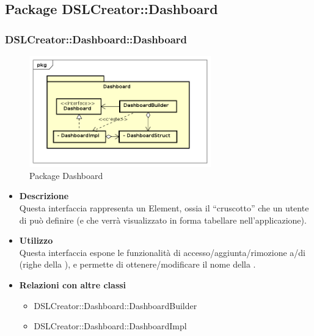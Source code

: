         \subsection{Package DSLCreator::Dashboard}
                \subsubsection{DSLCreator::Dashboard::Dashboard}
                \begin{figure}[H]
                  \centering
                  \includegraphics[width=0.7\textwidth]{res/img/Dashboard.png}
                  \caption{Package Dashboard}
                  \label{fig:diagram_model}
                \end{figure}
                    \begin{itemize}
                        \item \textbf{Descrizione} \hfill \\
                            Questa interfaccia rappresenta un  Element, ossia il ``cruscotto'' che un utente di  può definire (e che verrà visualizzato in forma tabellare nell'applicazione).
                        \item \textbf{Utilizzo}  \hfill \\
                            Questa interfaccia espone le funzionalità di accesso/aggiunta/rimozione a/di  (righe della ), e permette di ottenere/modificare il nome della .
                        \item \textbf{Relazioni con altre classi} \hfill 
                            \begin{itemize}
                              \item DSLCreator::Dashboard::DashboardBuilder
                              \item DSLCreator::Dashboard::DashboardImpl
                            \end{itemize}
                    \end{itemize}

